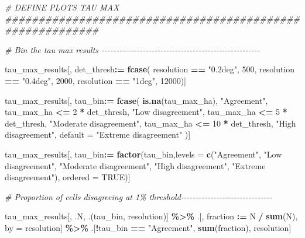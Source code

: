 \documentclass[
  11pt,
]{article}
\newenvironment{Shaded}{\begin{snugshade}}{\end{snugshade}}
\newcommand{\AttributeTok}[1]{\textcolor[rgb]{0.13,0.29,0.53}{#1}}
\newcommand{\CommentTok}[1]{\textcolor[rgb]{0.56,0.35,0.01}{\textit{#1}}}
\newcommand{\ConstantTok}[1]{\textcolor[rgb]{0.56,0.35,0.01}{#1}}
\newcommand{\DecValTok}[1]{\textcolor[rgb]{0.00,0.00,0.81}{#1}}
\newcommand{\FunctionTok}[1]{\textcolor[rgb]{0.13,0.29,0.53}{\textbf{#1}}}
\newcommand{\NormalTok}[1]{#1}
\newcommand{\OtherTok}[1]{\textcolor[rgb]{0.56,0.35,0.01}{#1}}
\newcommand{\SpecialCharTok}[1]{\textcolor[rgb]{0.81,0.36,0.00}{\textbf{#1}}}
\newcommand{\StringTok}[1]{\textcolor[rgb]{0.31,0.60,0.02}{#1}}
\begin{document}
\begin{Shaded}
\begin{Highlighting}[]
\CommentTok{\# DEFINE PLOTS TAU MAX \#\#\#\#\#\#\#\#\#\#\#\#\#\#\#\#\#\#\#\#\#\#\#\#\#\#\#\#\#\#\#\#\#\#\#\#\#\#\#\#\#\#\#\#\#\#\#\#\#\#\#\#\#\#\#\#\#\#}

\CommentTok{\# Bin the tau max results {-}{-}{-}{-}{-}{-}{-}{-}{-}{-}{-}{-}{-}{-}{-}{-}{-}{-}{-}{-}{-}{-}{-}{-}{-}{-}{-}{-}{-}{-}{-}{-}{-}{-}{-}{-}{-}{-}{-}{-}{-}{-}{-}{-}{-}{-}{-}{-}{-}{-}{-}{-}{-}{-}}

\NormalTok{tau\_max\_results[, det\_thresh}\SpecialCharTok{:=} \FunctionTok{fcase}\NormalTok{(}
\NormalTok{  resolution }\SpecialCharTok{==} \StringTok{"0.2deg"}\NormalTok{, }\DecValTok{500}\NormalTok{,}
\NormalTok{  resolution }\SpecialCharTok{==} \StringTok{"0.4deg"}\NormalTok{, }\DecValTok{2000}\NormalTok{,}
\NormalTok{  resolution }\SpecialCharTok{==} \StringTok{"1deg"}\NormalTok{, }\DecValTok{12000}\NormalTok{)]}

\NormalTok{tau\_max\_results[, tau\_bin}\SpecialCharTok{:=} \FunctionTok{fcase}\NormalTok{(}
  \FunctionTok{is.na}\NormalTok{(tau\_max\_ha), }\StringTok{"Agreement"}\NormalTok{,}
\NormalTok{  tau\_max\_ha }\SpecialCharTok{\textless{}=} \DecValTok{2} \SpecialCharTok{*}\NormalTok{ det\_thresh, }\StringTok{"Low disagreement"}\NormalTok{,}
\NormalTok{  tau\_max\_ha }\SpecialCharTok{\textless{}=} \DecValTok{5} \SpecialCharTok{*}\NormalTok{ det\_thresh, }\StringTok{"Moderate disagreement"}\NormalTok{,}
\NormalTok{  tau\_max\_ha }\SpecialCharTok{\textless{}=} \DecValTok{10} \SpecialCharTok{*}\NormalTok{ det\_thresh, }\StringTok{"High disagreement"}\NormalTok{,}
  \AttributeTok{default =} \StringTok{"Extreme disagreement"}
\NormalTok{)]}

\NormalTok{tau\_max\_results[, tau\_bin}\SpecialCharTok{:=} \FunctionTok{factor}\NormalTok{(tau\_bin,}\AttributeTok{levels =} \FunctionTok{c}\NormalTok{(}\StringTok{"Agreement"}\NormalTok{,}
                                                       \StringTok{"Low disagreement"}\NormalTok{,}
                                                       \StringTok{"Moderate disagreement"}\NormalTok{,}
                                                       \StringTok{"High disagreement"}\NormalTok{,}
                                                       \StringTok{"Extreme disagreement"}\NormalTok{),}
                                    \AttributeTok{ordered =} \ConstantTok{TRUE}\NormalTok{)]}

\CommentTok{\# Proportion of cells disagreeing at 1\% threshold{-}{-}{-}{-}{-}{-}{-}{-}{-}{-}{-}{-}{-}{-}{-}{-}{-}{-}{-}{-}{-}{-}{-}{-}{-}{-}{-}{-}{-}{-}{-}}

\NormalTok{tau\_max\_results[, .N, .(tau\_bin, resolution)] }\SpecialCharTok{\%\textgreater{}\%}
\NormalTok{  .[, fraction }\SpecialCharTok{:=}\NormalTok{ N }\SpecialCharTok{/} \FunctionTok{sum}\NormalTok{(N), by }\OtherTok{=}\NormalTok{ resolution] }\SpecialCharTok{\%\textgreater{}\%}
\NormalTok{  .[}\SpecialCharTok{!}\NormalTok{tau\_bin }\SpecialCharTok{==} \StringTok{"Agreement"}\NormalTok{, }\FunctionTok{sum}\NormalTok{(fraction), resolution]}
\end{Highlighting}
\end{Shaded}
\end{document}
